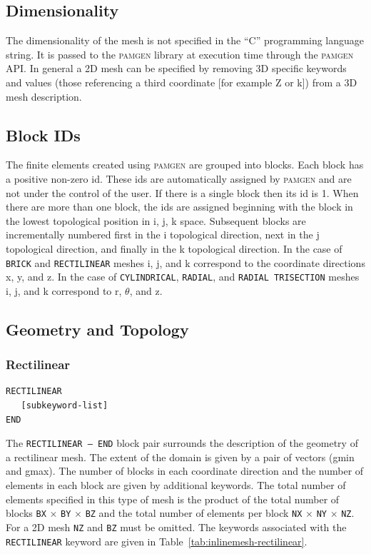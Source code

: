 \subsection{Dimensionality}
\label{sec:dimensionality}
The dimensionality of the mesh is not specified in the ``C'' programming language string. It is passed to the \textsc{pamgen} library at execution time through the \textsc{pamgen} API.  In general a 2D mesh can be specified by removing 3D specific keywords and values (those referencing a third coordinate [for example Z or k]) from a 3D mesh description.

\subsection{Block IDs}
\label{sec:blockids}
The finite elements created using \textsc{pamgen} are grouped into blocks. Each block has a positive non-zero id.  These ids are automatically assigned by \textsc{pamgen} and are not under the control of the user. If there is a single block then its id is 1. When there are more than  one block, the ids are assigned beginning with the block in the lowest topological position in i, j, k space. Subsequent blocks are incrementally numbered first in the i topological direction, next in the j topological direction, and finally in the k topological direction. In the case of \texttt{BRICK} and \texttt{RECTILINEAR} meshes i, j, and k correspond to the coordinate directions x, y, and z. In the case of \texttt{CYLINDRICAL}, \texttt{RADIAL}, and \texttt{RADIAL TRISECTION} meshes i, j, and k correspond to r, $\theta$, and z.


\clearpage
\subsection{Geometry and Topology}
\label{sec:inline-mesh}

\subsubsection {Rectilinear}
{\ttfamily \begin{verbatim}
RECTILINEAR
   [subkeyword-list]
END
\end{verbatim}
}

The \texttt{RECTILINEAR -- END} block pair surrounds the description
of the geometry of a rectilinear mesh.  The extent
of the domain is given by a pair of vectors (gmin and gmax).  The
number of blocks in each coordinate direction and the number of
elements in each block are given by additional keywords.  The total
number of elements specified in this type of mesh is the
product of the total number of blocks \texttt{BX} $\times$ \texttt{BY}
$\times$ \texttt{BZ} and the total number of elements per block
\texttt{NX} $\times$ \texttt{NY} $\times$ \texttt{NZ}.  For a 2D mesh
\texttt{NZ} and \texttt{BZ} must be omitted.  The keywords associated
with the \texttt{RECTILINEAR} keyword are given in
Table~\ref{tab:inlinemesh-rectilinear}.

